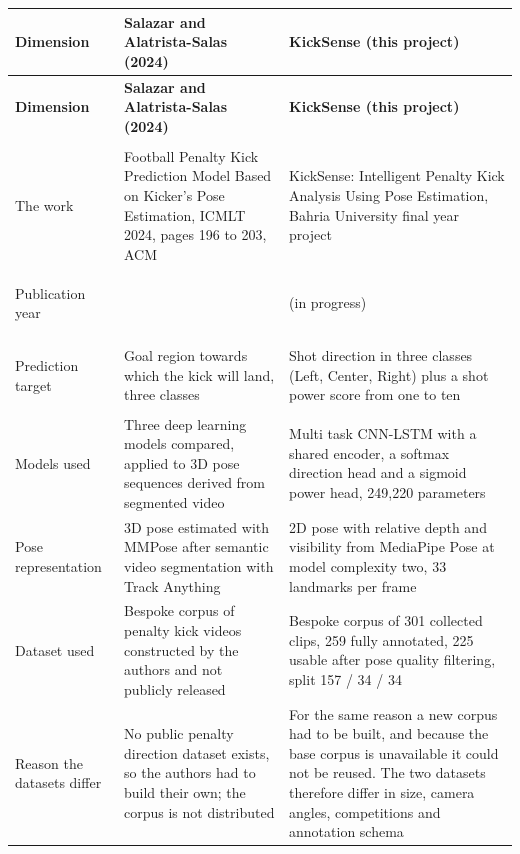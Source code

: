 \begin{longtable}{|>{\raggedright\arraybackslash\bfseries}p{2.6cm}|
>{\raggedright\arraybackslash}p{5.6cm}|
>{\raggedright\arraybackslash}p{5.6cm}|}

\hline
\textbf{Dimension} & \textbf{Salazar and Alatrista-Salas (2024)} & \textbf{KickSense (this project)} \\
\hline
\endfirsthead

\hline
\textbf{Dimension} & \textbf{Salazar and Alatrista-Salas (2024)} & \textbf{KickSense (this project)} \\
\hline
\endhead

\hline
\multicolumn{3}{r}{\textit{Continued on next page}} \\
\hline
\endfoot

\hline
\endlastfoot

The work &
Football Penalty Kick Prediction Model Based on Kicker's Pose Estimation, ICMLT 2024, pages 196 to 203, ACM &
KickSense: Intelligent Penalty Kick Analysis Using Pose Estimation, Bahria University final year project \\ \hline

Publication year &
2024 &
2026 (in progress) \\ \hline

Prediction target &
Goal region towards which the kick will land, three classes &
Shot direction in three classes (Left, Center, Right) plus a shot power score from one to ten \\ \hline

Models used &
Three deep learning models compared, applied to 3D pose sequences derived from segmented video &
Multi task CNN-LSTM with a shared encoder, a softmax direction head and a sigmoid power head, 249,220 parameters \\ \hline

Pose representation &
3D pose estimated with MMPose after semantic video segmentation with Track Anything &
2D pose with relative depth and visibility from MediaPipe Pose at model complexity two, 33 landmarks per frame \\ \hline

Dataset used &
Bespoke corpus of penalty kick videos constructed by the authors and not publicly released &
Bespoke corpus of 301 collected clips, 259 fully annotated, 225 usable after pose quality filtering, split 157 / 34 / 34 \\ \hline

Reason the datasets differ &
No public penalty direction dataset exists, so the authors had to build their own; the corpus is not distributed &
For the same reason a new corpus had to be built, and because the base corpus is unavailable it could not be reused. The two datasets therefore differ in size, camera angles, competitions and annotation schema \\ \hline


\end{longtable}
